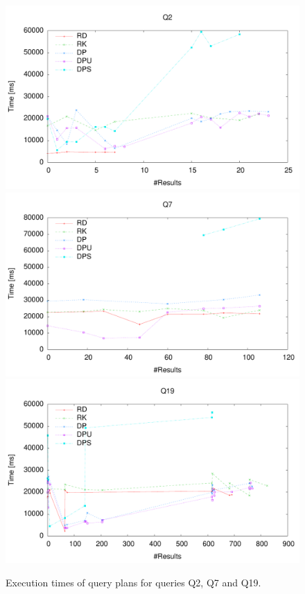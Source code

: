 \begin{figure}[htb]
  \centering
  \includegraphics[width=0.32\linewidth]{figs/pareto_exec_0_q2.pdf}
  \includegraphics[width=0.32\linewidth]{figs/pareto_exec_0_q7.pdf}
  \includegraphics[width=0.32\linewidth]{figs/pareto_exec_0_q19.pdf}
  \caption{Execution times of query plans for queries Q2, Q7 and Q19.}
  \label{fig:exec}
\end{figure}
